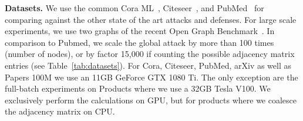 \documentclass[sigconf,authordraft]{acmart}
\begin{document}
\begin{table}[t]
  \centering
  \caption{Statistics of the used datasets. For the dense adjacency matrix we assume that each element is represented by 4 bytes. In the sparse case we use two 8 byte integer pointers and a 4 bytes float value.}
  \label{tab:datasets}
\end{table}

\textbf{Datasets.} We use the common Cora ML~\citep{Bojchevski2018}, Citeseer~\citep{McCallum2000}, and PubMed~\citep{Sen2008} for comparing against the other state of the art attacks and defenses. For large scale experiments, we use two graphs of the recent Open Graph Benchmark~\citep{Hu2020}. In comparison to Pubmed, we scale the global attack by more than 100 times (number of nodes), or by factor 15,000 if counting the possible adjacency matrix entries (see Table~\ref{tab:datasets}). For Cora, Citeseer, PubMed, arXiv as well as Papers 100M we use an 11GB GeForce GTX 1080 Ti. The only exception are the full-batch experiments on Products where we use a 32GB Tesla V100. We exclusively perform the calculations on GPU, but for products where we coalesce the adjacency matrix on CPU.
\end{document}
